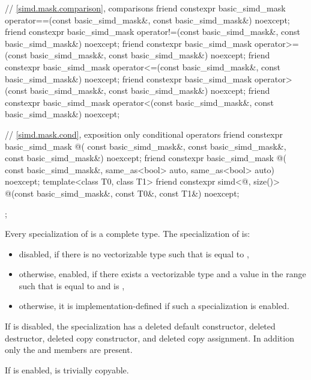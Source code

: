 \begin{codeblock}
{  // \ref{simd.mask.comparison},  comparisons
  friend constexpr basic_simd_mask
    operator==(const basic_simd_mask&, const basic_simd_mask&) noexcept;
  friend constexpr basic_simd_mask
    operator!=(const basic_simd_mask&, const basic_simd_mask&) noexcept;
  friend constexpr basic_simd_mask
    operator>=(const basic_simd_mask&, const basic_simd_mask&) noexcept;
  friend constexpr basic_simd_mask
    operator<=(const basic_simd_mask&, const basic_simd_mask&) noexcept;
  friend constexpr basic_simd_mask
    operator>(const basic_simd_mask&, const basic_simd_mask&) noexcept;
  friend constexpr basic_simd_mask
    operator<(const basic_simd_mask&, const basic_simd_mask&) noexcept;

  // \ref{simd.mask.cond},  exposition only conditional operators
  friend constexpr basic_simd_mask @\simdselect@(
    const basic_simd_mask&, const basic_simd_mask&, const basic_simd_mask&) noexcept;
  friend constexpr basic_simd_mask @\simdselect@(
    const basic_simd_mask&, same_as<bool> auto, same_as<bool> auto) noexcept;
  template<class T0, class T1>
    friend constexpr simd<@\seebelow@, size()>
      @\simdselect@(const basic_simd_mask&, const T0&, const T1&) noexcept;
};
\end{codeblock}

\pnum
Every specialization of  is a complete type.
The specialization of  is:
\begin{itemize}
  \item disabled, if there is no vectorizable type  such that  is
    equal to ,
  \item otherwise, enabled, if there exists a vectorizable type  and a value  in
    the range  such that  is equal to  and 
    is ,
  \item otherwise, it is implementation-defined if such a specialization is enabled.
\end{itemize}

If  is disabled, the specialization has a deleted
default constructor, deleted destructor, deleted copy constructor, and deleted copy assignment.
In addition only the  and  members are present.

If  is enabled,  is
trivially copyable.

